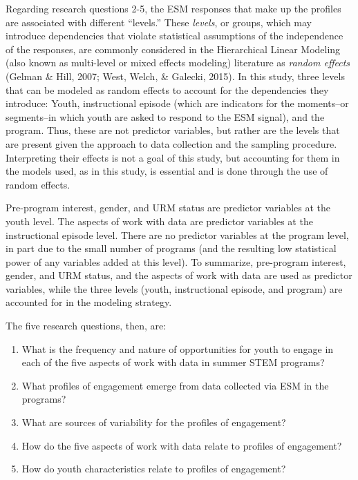 \documentclass[]{msu-thesis}
\providecommand{\tightlist}{%
  \setlength{\itemsep}{0pt}\setlength{\parskip}{0pt}}
\theoremstyle{definition}
\theoremstyle{definition}
\theoremstyle{definition}
\theoremstyle{remark}
\begin{document}
Regarding research questions 2-5, the ESM responses that make up the
profiles are associated with different ``levels.'' These \emph{levels},
or groups, which may introduce dependencies that violate statistical
assumptions of the independence of the responses, are commonly
considered in the Hierarchical Linear Modeling (also known as
multi-level or mixed effects modeling) literature as \emph{random
effects} (Gelman \& Hill, 2007; West, Welch, \& Galecki, 2015). In this
study, three levels that can be modeled as random effects to account for
the dependencies they introduce: Youth, instructional episode (which are
indicators for the moments--or segments--in which youth are asked to
respond to the ESM signal), and the program. Thus, these are not
predictor variables, but rather are the levels that are present given
the approach to data collection and the sampling procedure. Interpreting
their effects is not a goal of this study, but accounting for them in
the models used, as in this study, is essential and is done through the
use of random effects.

Pre-program interest, gender, and URM status are predictor variables at
the youth level. The aspects of work with data are predictor variables
at the instructional episode level. There are no predictor variables at
the program level, in part due to the small number of programs (and the
resulting low statistical power of any variables added at this level).
To summarize, pre-program interest, gender, and URM status, and the
aspects of work with data are used as predictor variables, while the
three levels (youth, instructional episode, and program) are accounted
for in the modeling strategy.

The five research questions, then, are:

\begin{enumerate}
\def\labelenumi{\arabic{enumi}.}
\tightlist
\item
  What is the frequency and nature of opportunities for youth to engage
  in each of the five aspects of work with data in summer STEM programs?
\item
  What profiles of engagement emerge from data collected via ESM in the
  programs?
\item
  What are sources of variability for the profiles of engagement?
\item
  How do the five aspects of work with data relate to profiles of
  engagement?
\item
  How do youth characteristics relate to profiles of engagement?
\end{enumerate}
\end{document}
